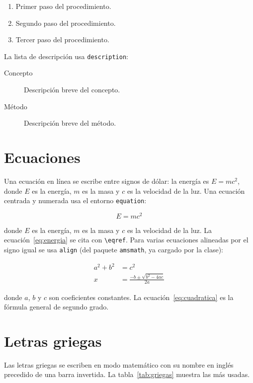 \begin{enumerate}
\item Primer paso del procedimiento.
\item Segundo paso del procedimiento.
\item Tercer paso del procedimiento.
\end{enumerate}

La lista de descripción usa \verb|description|:

\begin{description}
\item[Concepto] Descripción breve del concepto.
\item[Método] Descripción breve del método.
\end{description}

\section{Ecuaciones}\label{sec:ecuaciones}

Una ecuación en línea se escribe entre signos de dólar: la energía es
$E = mc^2$, donde $E$ es la energía, $m$ es la masa y $c$ es la velocidad
de la luz. Una ecuación centrada y numerada usa el entorno
\verb|equation|:

\begin{equation}
E = mc^2
\label{eq:energia}
\end{equation}

donde $E$ es la energía, $m$ es la masa y $c$ es la velocidad de la luz.
La ecuación~\eqref{eq:energia} se cita con \verb|\eqref|. Para varias
ecuaciones alineadas por el signo igual se usa \verb|align| (del paquete
\verb|amsmath|, ya cargado por la clase):

\begin{align}
a^2 + b^2 &= c^2 \\
x &= \frac{-b \pm \sqrt{b^2 - 4ac}}{2a}
\label{eq:cuadratica}
\end{align}

donde $a$, $b$ y $c$ son coeficientes constantes. La
ecuación~\eqref{eq:cuadratica} es la fórmula general de segundo grado.

\section{Letras griegas}

Las letras griegas se escriben en modo matemático con su nombre en
inglés precedido de una barra invertida. La tabla~\ref{tab:griegas}
muestra las más usadas.

